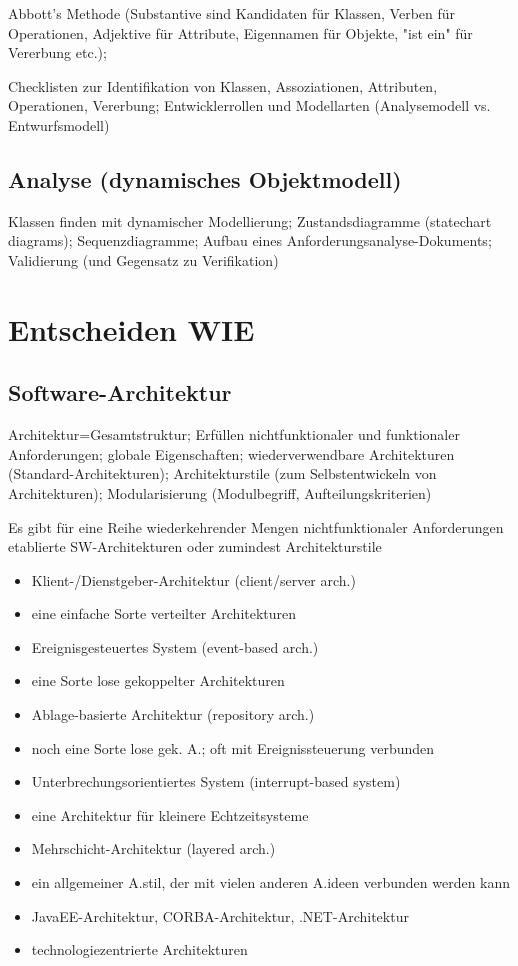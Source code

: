Abbott's Methode (Substantive sind Kandidaten für Klassen, Verben für Operationen,
Adjektive für Attribute, Eigennamen für Objekte, "ist ein" für Vererbung etc.);

Checklisten zur Identifikation von Klassen, Assoziationen, Attributen, Operationen, Vererbung;
Entwicklerrollen und Modellarten (Analysemodell vs. Entwurfsmodell) 

\subsection{Analyse (dynamisches Objektmodell)}
Klassen finden mit dynamischer Modellierung; Zustandsdiagramme (statechart diagrams);
Sequenzdiagramme; Aufbau eines Anforderungsanalyse-Dokuments;
Validierung (und Gegensatz zu Verifikation) 

\section{Entscheiden WIE}

\subsection{Software-Architektur}
Architektur=Gesamtstruktur; Erfüllen nichtfunktionaler und funktionaler Anforderungen;
globale Eigenschaften; wiederverwendbare Architekturen (Standard-Architekturen);
Architekturstile (zum Selbstentwickeln von Architekturen);
Modularisierung (Modulbegriff, Aufteilungskriterien)

Es gibt für eine Reihe wiederkehrender Mengen
nichtfunktionaler Anforderungen etablierte SW-Architekturen
oder zumindest Architekturstile
\begin{itemize}
\item Klient-/Dienstgeber-Architektur (client/server arch.)
\item eine einfache Sorte verteilter Architekturen
\item Ereignisgesteuertes System (event-based arch.)
\item eine Sorte lose gekoppelter Architekturen
\item Ablage-basierte Architektur (repository arch.)
\item noch eine Sorte lose gek. A.; oft mit Ereignissteuerung verbunden
\item Unterbrechungsorientiertes System (interrupt-based system)
\item eine Architektur für kleinere Echtzeitsysteme
\item Mehrschicht-Architektur (layered arch.)
\item ein allgemeiner A.stil, der mit vielen anderen A.ideen verbunden werden kann
\item JavaEE-Architektur, CORBA-Architektur, .NET-Architektur
\item technologiezentrierte Architekturen
\end{itemize}

